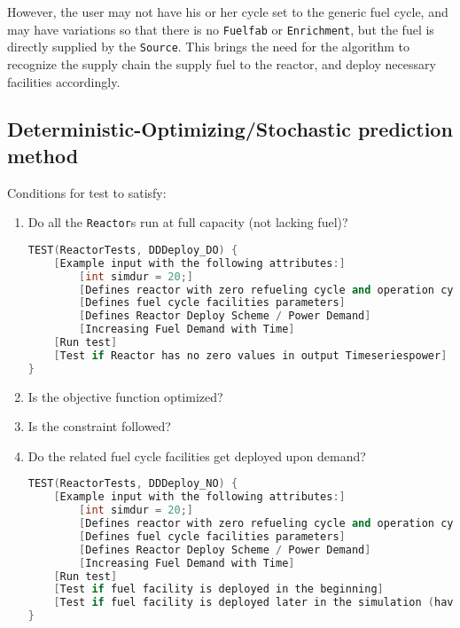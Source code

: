 \documentclass[12pt,letterpaper]{article}
\begin{document}
However, the user may not have his or her cycle set to the generic fuel cycle, and may have
variations so that there is no \texttt{Fuelfab} or \texttt{Enrichment}, but the fuel is
directly supplied by the \texttt{Source}. This brings the need for the algorithm to recognize
the supply chain the supply fuel to the reactor, and deploy necessary facilities accordingly. 


\subsection{Deterministic-Optimizing/Stochastic prediction method}
Conditions for test to satisfy: 

\begin{enumerate}
\item  Do all the \texttt{Reactor}s run at full capacity (not lacking fuel)? 
\begin{lstlisting}[language=C++, caption=Test to see all reactors run without lack of fuel]
TEST(ReactorTests, DDDeploy_DO) {
    [Example input with the following attributes:]
        [int simdur = 20;]
        [Defines reactor with zero refueling cycle and operation cycle of 1 month]
        [Defines fuel cycle facilities parameters]
        [Defines Reactor Deploy Scheme / Power Demand]
        [Increasing Fuel Demand with Time]
    [Run test]
    [Test if Reactor has no zero values in output Timeseriespower]
}
\end{lstlisting}

\item Is the objective function optimized?

\item Is the constraint followed? 

\item  Do the related fuel cycle facilities get deployed upon demand?
\begin{lstlisting}[language=C++, caption=Test demand-driven deployment of fuel cycle facility]
TEST(ReactorTests, DDDeploy_NO) {
    [Example input with the following attributes:]
        [int simdur = 20;]
        [Defines reactor with zero refueling cycle and operation cycle of 1 month]
        [Defines fuel cycle facilities parameters]
        [Defines Reactor Deploy Scheme / Power Demand]
        [Increasing Fuel Demand with Time]
    [Run test]
    [Test if fuel facility is deployed in the beginning]
    [Test if fuel facility is deployed later in the simulation (have analytic solution)]
}
\end{lstlisting}


\end{enumerate}
\end{document}
